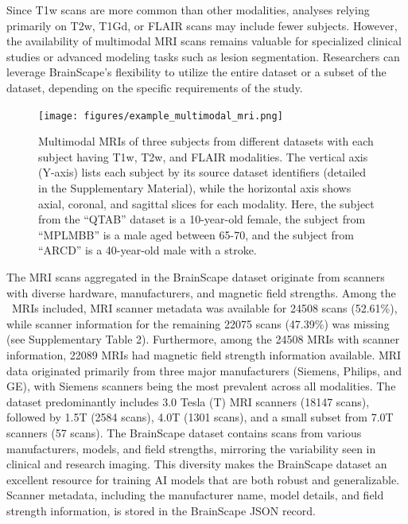 Since T1w scans are more common than other modalities, 
analyses relying primarily on T2w, T1Gd, or FLAIR scans may include fewer subjects. 
However, the availability of multimodal MRI scans remains valuable for specialized clinical studies or advanced modeling tasks such as lesion segmentation. 
Researchers can leverage BrainScape's flexibility to utilize the entire dataset or a subset of the dataset, depending on the specific requirements of the study.

\begin{figure}[ht]
    \centering
    \texttt{[image: figures/example\_multimodal\_mri.png]} 
    \caption{
        Multimodal MRIs of three subjects from different datasets with each subject having T1w, T2w, and FLAIR modalities. 
        The vertical axis (Y-axis) lists each subject by its source dataset identifiers (detailed in the Supplementary Material), 
        while the horizontal axis shows axial, coronal, and sagittal slices for each modality. 
        Here, the subject from the ``QTAB'' dataset is a 10-year-old female, 
        the subject from ``MPLMBB'' is a male aged between 65-70, 
        and the subject from ``ARCD'' is a 40-year-old male with a stroke. 
    }
    \label{fig:ExampleMultimodal}
\end{figure}

The MRI scans aggregated in the BrainScape dataset originate from scanners with diverse hardware, manufacturers, and magnetic field strengths.
Among the \TotalNumMRIs\ MRIs included, MRI scanner metadata was available for 24508 scans (52.61\%), 
while scanner information for the remaining 22075 scans (47.39\%) was missing (see Supplementary Table 2). 
Furthermore, among the 24508 MRIs with scanner information, 22089 MRIs had magnetic field strength information available.
MRI data originated primarily from three major manufacturers (Siemens, Philips, and GE), 
with Siemens scanners being the most prevalent across all modalities. 
The dataset predominantly includes 3.0 Tesla (T) MRI scanners (18147 scans), followed by 1.5T (2584 scans), 
4.0T (1301 scans), and a small subset from 7.0T scanners (57 scans). 
The BrainScape dataset contains scans from various manufacturers, models, and field strengths, 
mirroring the variability seen in clinical and research imaging. 
This diversity makes the BrainScape dataset an excellent resource for training AI models that are both robust and generalizable.
Scanner metadata, including the manufacturer name, model details, and field strength information, is stored in the BrainScape JSON record.

